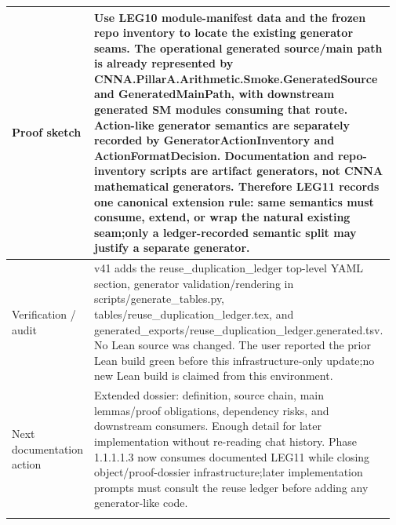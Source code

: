 \begin{longtable}{L{0.16\linewidth} L{0.81\linewidth}}
\hline\addlinespace[0.20em]
Proof sketch & Use LEG10 module-manifest data and the frozen repo inventory to locate the existing generator seams. The operational generated source/\allowbreak{}main path is already represented by CNNA.PillarA.Arithmetic.Smoke.GeneratedSource and GeneratedMainPath, with downstream generated SM modules consuming that route. Action-like generator semantics are separately recorded by GeneratorActionInventory and ActionFormatDecision. Documentation and repo-inventory scripts are artifact generators, not CNNA mathematical generators. Therefore LEG11 records one canonical extension rule: same semantics must consume, extend, or wrap the natural existing seam;\newline only a ledger-recorded semantic split may justify a separate generator.\\
\hline\addlinespace[0.20em]
Verification /\allowbreak{} audit & v41 adds the reuse\_duplication\_ledger top-level YAML section, generator validation/\allowbreak{}rendering in scripts/\allowbreak{}generate\_tables.py, tables/\allowbreak{}reuse\_duplication\_ledger.tex, and generated\_exports/\allowbreak{}reuse\_duplication\_ledger.generated.tsv. No Lean source was changed. The user reported the prior Lean build green before this infrastructure-only update;\newline no new Lean build is claimed from this environment.\\
\hline\addlinespace[0.20em]
Next documentation action & Extended dossier: definition, source chain, main lemmas/\allowbreak{}proof obligations, dependency risks, and downstream consumers. Enough detail for later implementation without re-reading chat history. Phase 1.1.1.1.3 now consumes documented LEG11 while closing object/\allowbreak{}proof-dossier infrastructure;\newline later implementation prompts must consult the reuse ledger before adding any generator-like code.\\
\hline\addlinespace[0.20em]
\end{longtable}
